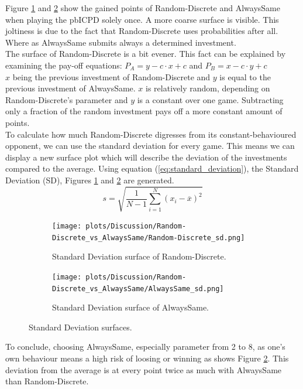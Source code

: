 \documentclass[11pt]{article}
\begin{document}
	Figure \ref{fig:RNDD_one-iter} and \ref{fig:ALWS_one-iter} show the gained points of Random-Discrete and AlwaysSame when playing the pbICPD solely once.
	A more coarse surface is visible.
	This joltiness is due to the fact that Random-Discrete uses probabilities after all.
	Where as AlwaysSame submits always a determined investment.\\
	The surface of Random-Discrete is a bit evener. 
	This fact can be explained by examining the pay-off equations:
	$P_A = y - c \cdot x + c$ and $P_B = x - c \cdot y + c$\\
	$x$ being the previous investment of Random-Discrete and $y$ is equal to the previous investment of AlwaysSame.
	$x$ is relatively random, depending on Random-Discrete's parameter and $y$ is a constant over one game.
	Subtracting only a fraction of the random investment pays off a more constant amount of points.\\
	To calculate how much Random-Discrete digresses from its constant-behavioured opponent, we can use the standard deviation for every game.
	This means we can display a new surface plot which will describe the deviation of the investments compared to the average.
	Using equation (\ref{eq:standard_deviation}), the Standard Deviation (SD), Figures \ref{fig:RNDD_one-iter} and \ref{fig:ALWS_one-iter} are generated.
	\begin{equation}
		s = \sqrt{\frac{1}{N-1} \sum_{i=1}^N (x_i - \overline{x})^2}
		\label{eq:standard_deviation}
	\end{equation}
	\begin{figure}[h]
		\centering
		\begin{subfigure}[t]{0.45\textwidth}
			\centering
				\texttt{[image: plots/Discussion/Random-Discrete\_vs\_AlwaysSame/Random-Discrete\_sd.png]}
			\caption{Standard Deviation surface of Random-Discrete.}
			\label{fig:RNDD_one-iter}
		\end{subfigure}\hfill
		\begin{subfigure}[t]{0.45\textwidth}
			\centering
				\texttt{[image: plots/Discussion/Random-Discrete\_vs\_AlwaysSame/AlwaysSame\_sd.png]}
			\caption{Standard Deviation surface of AlwaysSame.}
			\label{fig:ALWS_one-iter}
		\end{subfigure}
		\caption{Standard Deviation surfaces.}
		\label{fig:two_one-iter}
	\end{figure}
	To conclude, choosing AlwaysSame, especially parameter from 2 to 8, as one's own behaviour means a high risk of loosing or winning as shows Figure \ref{fig:ALWS_one-iter}.
	This deviation from the average is at every point twice as much with AlwaysSame than Random-Discrete.
\end{document}
